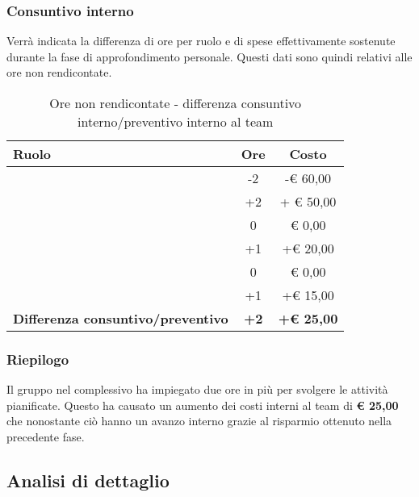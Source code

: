 		\subsubsection{Consuntivo interno} %
		\label{ssub:consuntivo}
		Verrà indicata la differenza di ore per ruolo e di spese effettivamente sostenute durante la fase di approfondimento personale. Questi dati sono quindi relativi alle ore non rendicontate.
		\begin{table}[!h]
			\begin{center}
				\begin{tabularx}{0.75\textwidth}{|X|c|c|}
					\hline
					\textbf{Ruolo} & \textbf{Ore} & \textbf{Costo} \\
					\hline
					\roleProjectManager & -2 & -\euro{} 60,00 \\
					\hline
					\roleAnalyst & +2 & + \euro{} 50,00 \\
					\hline
					\roleDesigner & 0 & \euro{} 0,00 \\
					\hline
					\roleAdministrator & +1  & +\euro{} 20,00 \\
					\hline
					\roleProgrammer & 0 & \euro{} 0,00 \\
					\hline
					\roleVerifier & +1 & +\euro{} 15,00 \\
					\hline
					\textbf{Differenza consuntivo/preventivo} & \textbf{+2} & \textbf{+\euro{} 25,00} \\
					\hline
				\end{tabularx}
			\end{center}
		\caption{Ore non rendicontate - differenza consuntivo interno/preventivo interno al team}
		\end{table}

		\subsubsection{Riepilogo} %
		\label{ssub:riepilogo}
		Il gruppo nel complessivo ha impiegato due ore in più per svolgere le attività pianificate. \newline
		Questo ha causato un aumento dei costi interni al team di \textbf{\euro{} 25,00} che nonostante ciò hanno un avanzo interno grazie al risparmio ottenuto nella precedente fase.


	\newpage
	\subsection{Analisi di dettaglio} %
	\label{sub:analisi_di_dettaglio}
